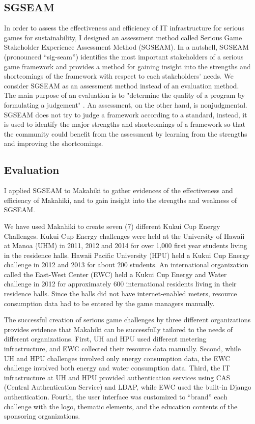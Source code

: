 \subsection{SGSEAM}
In order to assess the effectiveness and efficiency of IT infrastructure for serious games for 
sustainability, I designed an assessment method called Serious Game Stakeholder Experience Assessment Method (SGSEAM). In a nutshell, SGSEAM (pronounced ``sig-seam'') identifies the most important stakeholders of a
serious game framework and provides a method for gaining insight into the strengths
and shortcomings of the framework with respect to each stakeholders' needs. We consider
SGSEAM as an assessment method instead of an evaluation method. The main purpose of an
evaluation is to "determine the quality of a program by formulating a judgement"
\cite{hurteau2009legitimate}. An assessment, on the other hand, is nonjudgmental. SGSEAM does
not try to judge a framework according to a standard, instead, it is used to identify the major
strengths and shortcomings of a framework so that the community could benefit from the
assessment by learning from the strengths and improving the shortcomings.

\subsection{Evaluation}
I applied SGSEAM to Makahiki to gather evidences of the effectiveness and efficiency of Makahiki, and to gain insight into the strengths and weakness of SGSEAM.

We have used Makahiki to create seven (7) different Kukui Cup Energy Challenges. Kukui Cup
Energy challenges were held at the University of Hawaii at Manoa (UHM) in 2011, 2012 and 2014 for over
1,000 first year students living in the residence halls. Hawaii Pacific University (HPU)
held a Kukui Cup Energy challenge in 2012 and 2013 for about 200 students. An international
organization called the East-West Center (EWC) held a Kukui Cup Energy and Water challenge in 2012 
for approximately 600 international residents living in their residence halls. Since the
halls did not have internet-enabled meters, resource consumption data had to be entered by
the game managers manually.

The successful creation of serious game challenges by three different organizations
provides evidence that Makahiki can be successfully tailored
to the needs of different organizations. First, UH and HPU used different metering
infrastructure, and EWC collected their resource data manually.  Second, while UH and HPU
challenges involved only energy consumption data, the EWC challenge involved both energy
and water consumption data. Third, the IT infrastructure at UH and HPU provided
authentication services using CAS (Central Authentication Service) and LDAP, while EWC
used the built-in Django authentication.  Fourth, the user interface was customized to
``brand'' each challenge with the logo, thematic elements, and the education contents of
the sponsoring organizations.

